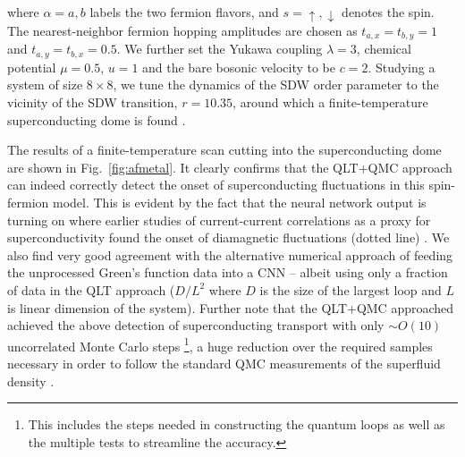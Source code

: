 \documentclass[amsmath,amssymb, aps, prx, longbibliography, twocolumn]{revtex4-1}
\begin{document}
where $\alpha=a,b$ labels the two fermion flavors, and $s = \uparrow, \downarrow$ denotes the spin. The nearest-neighbor fermion hopping amplitudes are chosen as $t_{a,x}=t_{b,y}=1$ and $t_{a,y}=t_{b,x}=0.5$. We further set the Yukawa coupling $\lambda=3$, chemical potential $\mu=0.5$, $u=1$ and the bare bosonic velocity to be $c=2$.
Studying a system of size $8\times 8$, we tune the dynamics of the SDW order parameter to the vicinity of the SDW transition, $r=10.35$, around which a finite-temperature superconducting dome is found \cite{Schattner2016}.






The results of a finite-temperature scan cutting into the superconducting dome are shown in Fig.~\ref{fig:afmetal}. It clearly confirms that the QLT+QMC approach can indeed correctly detect the onset of superconducting fluctuations in this spin-fermion model. This is evident by the fact that the neural network output is turning on where earlier studies of current-current correlations \cite{Schattner2016,Lederer2017} as a proxy for superconductivity found the onset of diamagnetic fluctuations (dotted line) \cite{Schattner2016}. 
We also find very good agreement with the alternative numerical approach of feeding the unprocessed Green's function data into a CNN -- albeit using only a fraction of data in the QLT approach ($D/L^2$ where $D$ is the size of the largest loop and $L$ is linear dimension of the system).
Further note that the QLT+QMC approached achieved the above detection of superconducting transport with only $\sim O(10)$ uncorrelated Monte Carlo steps \footnote{This includes the steps needed in constructing the quantum loops as well as the multiple tests to streamline the accuracy.}, a huge reduction over the required samples necessary in order to follow the standard QMC measurements of the superfluid density \cite{Hong2016, Schattner2016}. 



\end{document}
